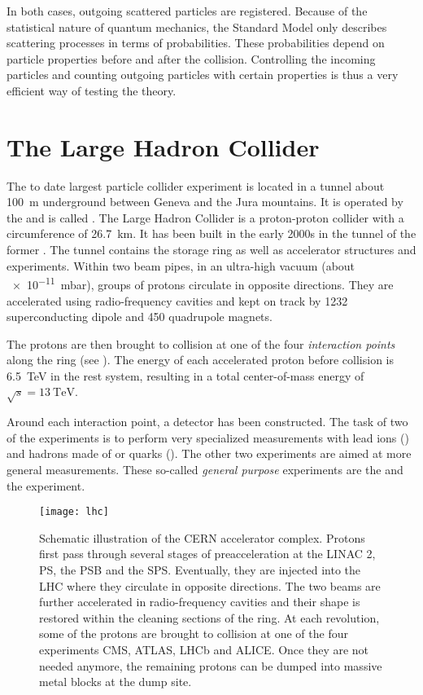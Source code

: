 In both cases, outgoing scattered particles are registered. 
Because of the statistical nature of quantum mechanics, the Standard Model only describes scattering processes in terms of probabilities. These probabilities depend on particle properties before and after the collision. 
Controlling the incoming particles and counting outgoing particles with certain properties is thus a very efficient way of testing the theory.

\section{The Large Hadron Collider}
The to date largest particle collider experiment is located in a tunnel about \SI{100}{\m} underground between Geneva and the Jura mountains. It is operated by the  and is called .
The Large Hadron Collider\cite{Evans:LHCMachine} is a proton-proton collider with a circumference of \SI{26.7}{\km}. It has been built in the early 2000s in the tunnel of the former . The tunnel contains the storage ring as well as accelerator structures and experiments. Within two beam pipes, in an ultra-high vacuum (about \SI{e-11}{\milli\bar}), groups of protons circulate in opposite directions. They are accelerated using radio-frequency cavities and kept on track by \num{1232} superconducting dipole and \num{450} quadrupole magnets.

The protons are then brought to collision at one of the four \emph{interaction points} along the ring (see ). The energy of each accelerated proton before collision is \SI{6.5}{\TeV} in the rest system, resulting in a total center-of-mass energy of $\sqrt{s} = \SI{13}{\TeV}$.

Around each interaction point, a detector has been constructed. The task of two of the experiments is to perform very specialized measurements with lead ions () and hadrons made of \Pcharm or \Pbottom quarks (). 
The other two experiments are aimed at more general measurements. These so-called \emph{general purpose} experiments are the  and the  experiment. 

\begin{figure}[p]
    \centering
    \texttt{[image: lhc]}
    \caption{Schematic illustration of the \acs{CERN} accelerator complex\cite{Ley:CERNAccelerators,Caron:LHCLayout,DeMelis:CERNacceleratorcomplex}. Protons first pass through several stages of preacceleration at the \ac{LINAC} 2, \ac{PS}, the \ac{PSB} and the \ac{SPS}. Eventually, they are injected into the \ac{LHC} where they circulate in opposite directions. The two beams are further accelerated in radio-frequency cavities and their shape is restored within the cleaning sections of the ring. At each revolution, some of the protons are brought to collision at one of the four experiments \acs{CMS}, \acs{ATLAS}, \acs{LHCb} and \acs{ALICE}. Once they are not needed anymore, the remaining protons can be dumped into massive metal blocks at the dump site.
    }
    \label{fig:LHC}
\end{figure}

